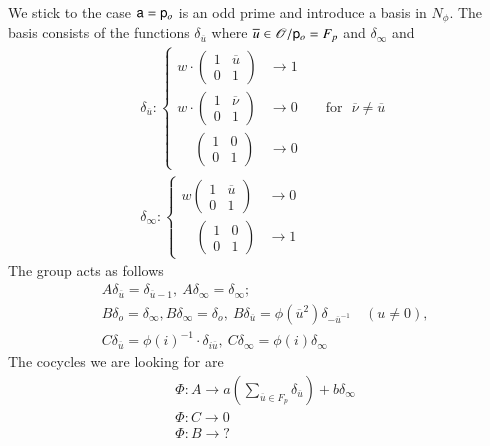 We stick to the case $\mathsf{a}=\mathsf{p}_{o}$ is an odd prime and introduce a basis in $N_{\phi}$. The basis consists of the functions $\delta_{\overline{u}}$ where $\overline{u}\in \mathscr{O}/\mathsf{p}_{o}=F_{p}$ and $\delta_{\infty}$ and
\begin{align*}
& \delta_{\overline{u}}:
\begin{cases}
w\cdot \left(\begin{matrix} 1 & \overline{u}\\ 0 & 1\end{matrix}\right) & \to 1\\
w\cdot \left(\begin{matrix} 1 & \overline{\nu}\\ 0 & 1\end{matrix}\right) & \to 0\qquad \text{for~ } \overline{\nu}\neq \overline{u}\\
\quad~ \left(\begin{matrix} 1 & 0\\ 0 & 1\end{matrix}\right) & \to 0
\end{cases}\\
&\delta_{\infty}: 
\begin{cases}
w \left(\begin{matrix} 1 & \overline{u}\\ 0 & 1\end{matrix}\right) & \to 0\\
\quad \left(\begin{matrix} 1 & 0\\ 0 & 1\end{matrix}\right) & \to 1
\end{cases}
\end{align*}
The group acts as follows
\begin{align*}
& A\delta_{\overline{u}}=\delta_{\overline{u}-1}, \ A\delta_{\infty}=\delta_{\infty};\\[3pt]
& B\delta_{o}=\delta_{\infty}, B\delta_{\infty}=\delta_{o}, \ B\delta_{\overline{u}}=\phi(\overline{u}^{2})\delta_{-\overline{u}^{-1}}\quad (u\neq 0),\\
& C\delta_{\overline{u}}=\phi(i)^{-1}\cdot \delta_{i\overline{u}}, \ C\delta_{\infty}=\phi(i)\delta_{\infty}
\end{align*}
The cocycles we are looking for are
\begin{align*}
&\Phi :A\to a\left(\sum\limits_{\overline{u}\in F_{p}}\delta_{\overline{u}}\right)+b\delta_{\infty}\\
&\Phi : C\to 0\\
&\Phi : B\to ?
\end{align*}

